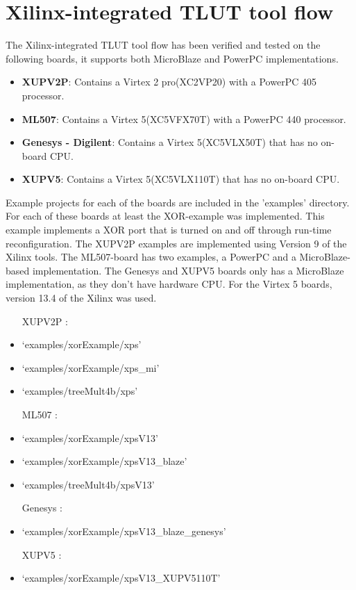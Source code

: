 \documentclass[a4paper,oneside]{memoir}
\begin{document}
\clearpage
\chapter{Xilinx-integrated TLUT tool flow}\label{sec:xilinx_flow}

The Xilinx-integrated TLUT tool flow has been verified and tested on the following boards, it supports both MicroBlaze and PowerPC implementations.
\begin{itemize}
	\item \textbf{XUPV2P}: Contains a Virtex 2 pro(XC2VP20) with a PowerPC 405 processor.
	\item \textbf{ML507}: Contains a Virtex 5(XC5VFX70T) with a PowerPC 440 processor.
	\item \textbf{Genesys - Digilent}: Contains a Virtex 5(XC5VLX50T) that has no on-board CPU.
        \item \textbf{XUPV5}: Contains a Virtex 5(XC5VLX110T) that has no on-board CPU.
\end{itemize}

Example projects for each of the boards are included in the 'examples' directory. For each of these boards at least the XOR-example was implemented. This example implements a XOR port that is turned on and off through run-time reconfiguration. The XUPV2P examples are implemented using Version 9 of the Xilinx tools. The ML507-board has two examples, a PowerPC and a MicroBlaze-based implementation. The Genesys and XUPV5 boards only has a MicroBlaze implementation, as they don't have hardware CPU. For the Virtex 5 boards, version 13.4 of the Xilinx was used.

\begin{itemize}
\item[XUPV2P :]
\item `examples/xorExample/xps'
\item `examples/xorExample/xps\_mi'
\item `examples/treeMult4b/xps'
\item[ML507 :]
\item `examples/xorExample/xpsV13'
\item `examples/xorExample/xpsV13\_blaze'
\item `examples/treeMult4b/xpsV13'
\item[Genesys :]
\item `examples/xorExample/xpsV13\_blaze\_genesys'
\item[XUPV5 :]
\item `examples/xorExample/xpsV13\_XUPV5110T'
\end{itemize}
\end{document}
